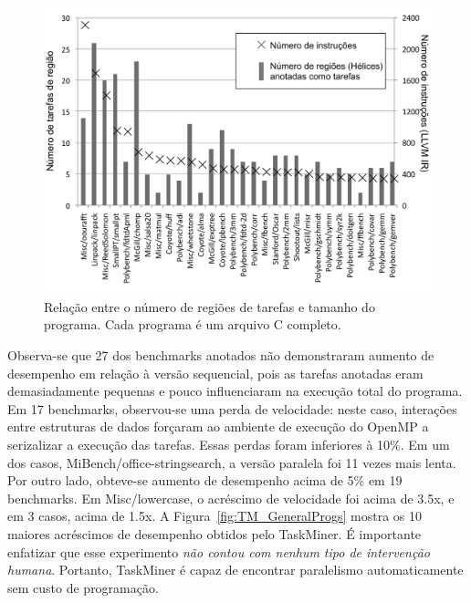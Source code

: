 \documentclass[sigplan,10pt,review]{acmart}
\newcommand\Taskminer{\mbox{\textsf{TaskMiner}}}
\begin{document}
\begin{figure}[htb]
\begin{center}
\includegraphics[width=1\columnwidth]{images/TM_Versatility}
\caption{Relação entre o número de regiões de tarefas e tamanho do programa.
Cada programa é um arquivo C completo.}
\label{fig:TM_Versatility}
\end{center}
\end{figure}

Observa-se que 27 dos benchmarks anotados não demonstraram aumento de desempenho em 
relação à versão sequencial,
pois as tarefas anotadas eram demasiadamente pequenas e pouco influenciaram na execução total do programa.
Em 17 benchmarks, observou-se uma perda de velocidade: neste caso, interações entre estruturas de dados
forçaram ao ambiente de execução do OpenMP a serizalizar a execução das tarefas. Essas perdas foram 
inferiores à 10\%. Em um dos casos, \textsf{MiBench/office-stringsearch}, a versão paralela foi 11 vezes mais lenta.
Por outro lado, obteve-se aumento de desempenho acima de 5\% em 19 benchmarks. 
Em \textsf{Misc/lowercase}, o acréscimo de velocidade foi acima de 3.5x, e em 3 casos, acima de 1.5x.
A Figura~\ref{fig:TM_GeneralProgs} mostra os 10 maiores acréscimos de desempenho obtidos pelo \Taskminer{}.
É importante enfatizar que esse experimento {\em não contou com nenhum tipo de intervenção humana}.
Portanto, \Taskminer{} é capaz de encontrar paralelismo automaticamente sem custo de programação.
\end{document}
